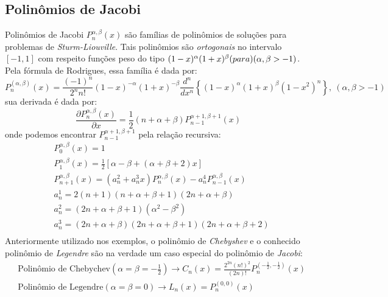 \subsection{Polinômios de Jacobi}
 Polinômios de Jacobi $P^{\alpha,\beta}_n(x)$ são famílias de polinômios de soluções para problemas de \emph{Sturm-Liouville}. Tais polinômios são \emph{ortogonais} no intervalo $[-1,1]$  com respeito funções peso do tipo $(1-x)^\alpha (1+x)^\beta \text(para) (\alpha,\beta > -1)$.
Pela fórmula de Rodrigues, essa família é dada por:
\begin{equation}
P_n^{(\alpha,\beta)}(x) = \frac{(-1)^n}{2^n n!} (1-x)^{-\alpha} (1+x)^{-\beta} \frac{d^n}{dx^n} \left\{ (1-x)^\alpha (1+x)^\beta \left (1 - x^2 \right )^n \right\},\ (\alpha, \beta >-1)
\end{equation}
 sua derivada é dada por:
\begin{equation}
\frac{\partial P^{\alpha,\beta}_n (x)}{\partial x} = \frac{1}{2}(n+\alpha+\beta) P^{\alpha + 1,\beta +1}_{n-1} (x)
\end{equation}
 onde podemos encontrar $P^{\alpha + 1,\beta +1}_{n-1}$ pela relação recursiva:
\begin{align}
& P^{\alpha,\beta}_{0} (x) = 1\\
& P^{\alpha,\beta}_{1} (x) = \frac{1}{2}[\alpha - \beta + (\alpha + \beta + 2 )x]\\
& P^{\alpha,\beta}_{n+1} (x)=(a^2_n + a ^3_n x)P^{\alpha,\beta}_{n}(x) - a_n^4P^{\alpha,\beta}_{n-1}(x)  \\
& a^1_n = 2(n+1)(n+ \alpha + \beta + 1)(2n + \alpha +\beta)\\
& a^2_n = (2n + \alpha +\beta + 1)(\alpha^2 - \beta^2)\\
& a^3_n = (2n + \alpha +\beta)(2n + \alpha +\beta + 1)(2n + \alpha + \beta + 2)\\ 
\end{align}
 Anteriormente utilizado nos exemplos, o polinômio de \emph{Chebyshev} e o conhecido polinômio de \emph{Legendre} são na verdade um caso especial do polinômio de \emph{Jacobi}:
\begin{align}
& \text{Polinômio de Chebychev} (\alpha= \beta = -\frac{1}{2})  \rightarrow  C_n(x) =\frac{2^{2n}(n!)^2}{ (2n)!} P^{(-\frac{1}{2},-\frac{1}{2})}_{n}(x) \\
& \text{Polinômio de Legendre} (\alpha= \beta = 0)  \rightarrow L_n(x) =  P^{(0,0)}_{n}(x)
\end{align}
 
